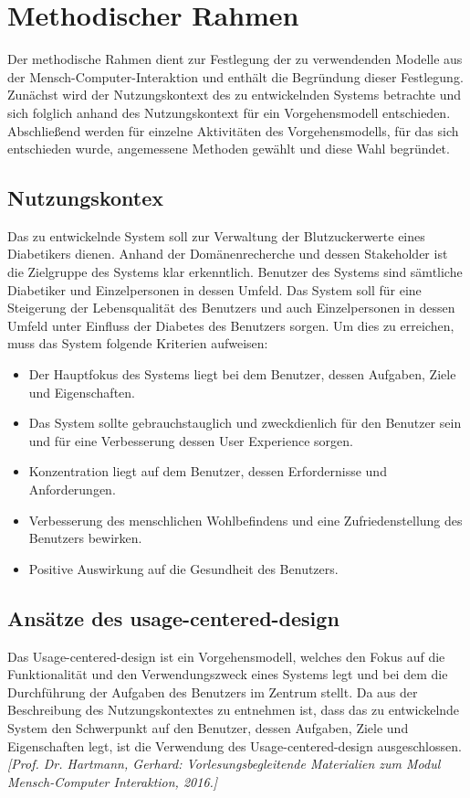 
	\section{Methodischer Rahmen}
	\label{section:Rahmen}
	Der methodische Rahmen dient zur Festlegung der zu verwendenden Modelle aus der Mensch-Computer-Interaktion und enthält die Begründung dieser Festlegung. Zunächst wird der Nutzungskontext des zu entwickelnden Systems betrachte und sich folglich anhand des Nutzungskontext für ein Vorgehensmodell entschieden. Abschließend werden für einzelne Aktivitäten des Vorgehensmodells, für das sich entschieden wurde, angemessene Methoden gewählt und diese Wahl begründet.
	\subsection{Nutzungskontex}
	Das zu entwickelnde System soll zur Verwaltung der Blutzuckerwerte eines Diabetikers dienen. Anhand der Domänenrecherche und dessen Stakeholder ist die Zielgruppe des Systems klar erkenntlich. Benutzer des Systems sind sämtliche Diabetiker und Einzelpersonen in dessen Umfeld. Das System soll für eine Steigerung der Lebensqualität des Benutzers und auch Einzelpersonen in dessen Umfeld unter Einfluss der Diabetes des Benutzers sorgen. Um dies zu erreichen, muss das System folgende Kriterien aufweisen:
	\begin{itemize}
		\item Der Hauptfokus des Systems liegt bei dem Benutzer, dessen Aufgaben, Ziele und Eigenschaften.
		\item Das System sollte gebrauchstauglich und zweckdienlich für den Benutzer sein und für eine Verbesserung dessen User Experience sorgen.
		\item Konzentration liegt auf dem Benutzer, dessen Erfordernisse und Anforderungen.
		\item Verbesserung des menschlichen Wohlbefindens und eine Zufriedenstellung des Benutzers bewirken.
		\item Positive Auswirkung auf die Gesundheit des Benutzers.
	\end{itemize}
	\subsection{Ansätze des usage-centered-design}
	Das Usage-centered-design ist ein Vorgehensmodell, welches den Fokus auf die Funktionalität und den Verwendungszweck eines Systems legt und bei dem die Durchführung der Aufgaben des Benutzers im Zentrum stellt. Da aus der Beschreibung des Nutzungskontextes zu entnehmen ist, dass das zu entwickelnde System den Schwerpunkt auf den Benutzer, dessen Aufgaben, Ziele und Eigenschaften legt, ist die Verwendung des Usage-centered-design ausgeschlossen. \emph{[Prof. Dr. Hartmann, Gerhard: Vorlesungsbegleitende Materialien zum Modul Mensch-Computer Interaktion, 2016.]}
